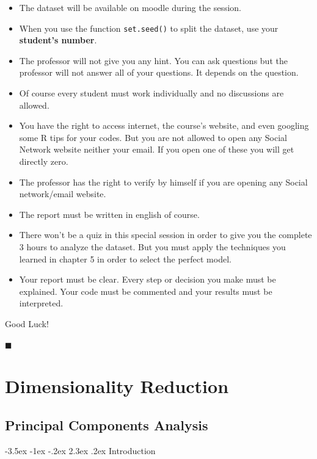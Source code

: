 \documentclass[]{book}
\makeatletter
\renewcommand\section{\@startsection {section}{1}{\z@}%
                                   {-3.5ex \@plus -1ex \@minus -.2ex}%
                                   {2.3ex \@plus.2ex}%
                                   {\normalfont\Large\bfseries\color{ForestGreen}}}
\theoremstyle{definition}
\theoremstyle{definition}
\theoremstyle{definition}
\theoremstyle{remark}
\makeatother
\begin{document}
\begin{itemize}
\item
  The dataset will be available on moodle during the session.
\item
  When you use the function \texttt{set.seed()} to split the dataset,
  use your \textbf{student's number}.
\item
  The professor will not give you any hint. You can ask questions but
  the professor will not answer all of your questions. It depends on the
  question.
\item
  Of course every student must work individually and no discussions are
  allowed.
\item
  You have the right to access internet, the course's website, and even
  googling some R tips for your codes. But you are not allowed to open
  any Social Network website neither your email. If you open one of
  these you will get directly zero.
\item
  The professor has the right to verify by himself if you are opening
  any Social network/email website.
\item
  The report must be written in english of course.
\item
  There won't be a quiz in this special session in order to give you the
  complete 3 hours to analyze the dataset. But you must apply the
  techniques you learned in chapter 5 in order to select the perfect
  model.
\item
  Your report must be clear. Every step or decision you make must be
  explained. Your code must be commented and your results must be
  interpreted.
\end{itemize}

Good Luck!

◼

\part{Dimensionality
Reduction}\label{part-dimensionality-reduction}

\chapter{Principal Components
Analysis}\label{principal-components-analysis}

\section{Introduction}\label{introduction-3}
\end{document}
